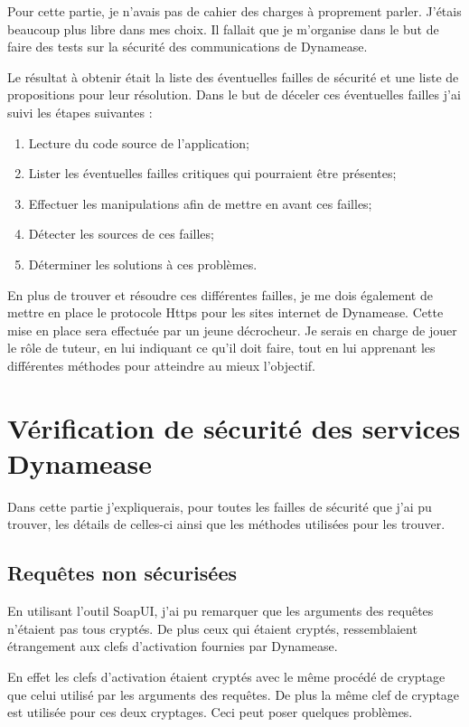 Pour cette partie, je n'avais pas de cahier des charges à proprement parler. J'étais beaucoup plus libre dans mes choix. Il fallait que je m'organise dans le but de faire des tests sur la sécurité des communications de Dynamease. 

Le résultat à obtenir était la liste des éventuelles failles de sécurité et une liste de propositions pour leur résolution. Dans le but de déceler ces éventuelles failles j'ai suivi les étapes suivantes :

\begin{enumerate}
	\item Lecture du code source de l'application;
	\item Lister les éventuelles failles critiques qui pourraient être présentes;
	\item Effectuer les manipulations afin de mettre en avant ces failles;
	\item Détecter les sources de ces failles;
	\item Déterminer les solutions à ces problèmes.
\end{enumerate} 

En plus de trouver et résoudre ces différentes failles, je me dois également de mettre en place le protocole Https pour les sites internet de Dynamease. Cette mise en place sera effectuée par un jeune décrocheur. Je serais en charge de jouer le rôle de tuteur, en lui indiquant ce qu'il doit faire, tout en lui apprenant les différentes méthodes pour atteindre au mieux l'objectif.

\section{Vérification de sécurité des services Dynamease}

Dans cette partie j'expliquerais, pour toutes les failles de sécurité que j'ai pu trouver, les détails de celles-ci ainsi que les méthodes utilisées pour les trouver.

\subsection{Requêtes non sécurisées}

En utilisant l'outil SoapUI, j'ai pu remarquer que les arguments des requêtes n'étaient pas tous cryptés. De plus ceux qui étaient cryptés, ressemblaient étrangement aux clefs d'activation fournies par Dynamease.

En effet les clefs d'activation étaient cryptés avec le même procédé de cryptage que celui utilisé par les arguments des requêtes. De plus la même clef de cryptage est utilisée pour ces deux cryptages. Ceci peut poser quelques problèmes.

